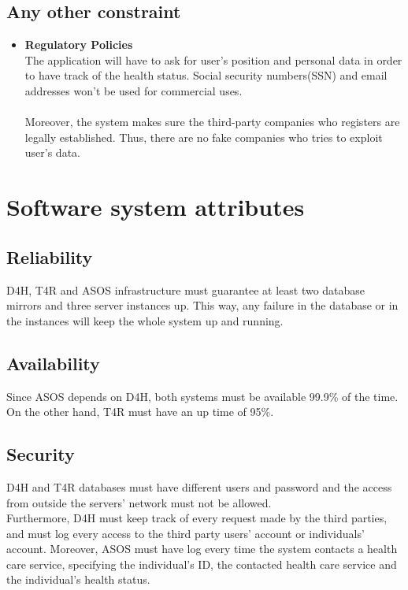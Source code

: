 \documentclass[hidelinks, 12pt]{report}
\begin{document}
	\subsection{Any other constraint}
	\begin{itemize}
		\item{} \textbf{Regulatory Policies}\\
		The application will have to ask for user's position and personal data in order to have track of the health status. Social security numbers(SSN) and email addresses won't be used for commercial uses.\\\\
		Moreover, the system makes sure the third-party companies who registers are legally established. Thus, there are no fake companies who tries to exploit user's data.
	\end{itemize}
	\section{Software system attributes}
	
	\subsection{Reliability}
	D4H, T4R and ASOS infrastructure must guarantee at least two database mirrors and three server instances up. This way, any failure in the database or in the instances will keep the whole system up and running.
	
	\subsection{Availability}
	Since ASOS depends on D4H, both systems must be available 99.9\% of the time. On the other hand, T4R must have an up time of 95\%.
	
	\subsection{Security}
	D4H and T4R databases must have different users and password and the access from outside the servers' network must not be allowed.\\
	
	Furthermore, D4H must keep track of every request made by the third parties, and must log every access to the third party users' account or individuals' account. Moreover, ASOS must have log every time the system contacts a health care service, specifying the individual's ID, the contacted health care service and the individual's health status. \\
	
\end{document}
